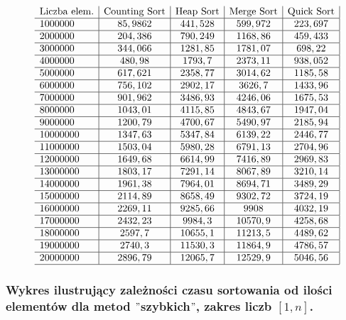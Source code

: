 \documentclass[polish,polish,a4paper]{article}
\begin{document}
\begin{spacing}{1.5}
\begin{figure}[H]
\begin{equation*}
\begin{array}{l|c|c|c|c|}
	$Liczba elem.$&$Counting Sort$&$Heap Sort$&$Merge Sort$&$Quick Sort$\\\hline
	1000000&	85,9862& 441,528& 599,972&	223,697\\\hline
	2000000& 204,386&	790,249&	1168,86&	459,433\\\hline
	3000000&	344,066&	1281,85&	1781,07&	698,22\\\hline
	4000000& 480,98&	1793,7&	2373,11&	938,052\\\hline
	5000000& 617,621&	2358,77&	3014,62&	1185,58\\\hline
	6000000& 756,102&	2902,17&	3626,7&	1433,96\\\hline
	7000000& 901,962&	3486,93&	4246,06&	1675,53\\\hline
	8000000& 1043,01&	4115,85&	4843,67&	1947,04\\\hline
	9000000& 1200,79&	4700,67&	5490,97&	2185,94\\\hline
	10000000& 	1347,63&	5347,84&	6139,22&	2446,77\\\hline
	11000000& 	1503,04&	5980,28&	6791,13&	2704,96\\\hline
	12000000& 	1649,68&	6614,99&	7416,89&	2969,83\\\hline
	13000000& 	1803,17&	7291,14&	8067,89&	3210,14\\\hline
	14000000& 	1961,38&	7964,01&	8694,71&	3489,29\\\hline
	15000000& 	2114,89&	8658,49&	9302,72&	3724,19\\\hline
	16000000& 	2269,11&	9285,66&	9908&	4032,19\\\hline
	17000000& 	2432,23&	9984,3&	10570,9&	4258,68\\\hline
	18000000& 	2597,7&	10655,1&	11213,5&	4489,62\\\hline
	19000000& 	2740,3&	11530,3&	11864,9&	4786,57\\\hline
	20000000& 	2896,79&	12065,7&	12529,9&	5046,56\\
	\hline

	\end{array}
	\end{equation*}
\end{figure}

\subsubsection*{Wykres ilustrujący zależności czasu sortowania od ilości elementów dla metod $"$szybkich$"$, zakres liczb $ [1,n] $.}


\end{spacing}
\end{document}
